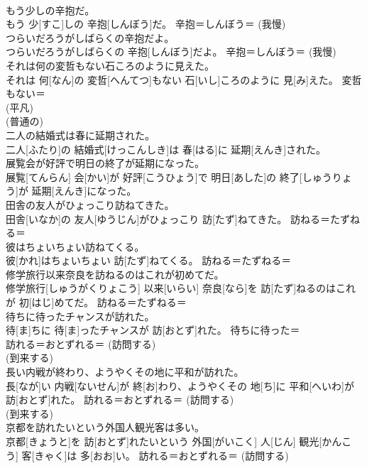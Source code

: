 \documentclass[8pt]{extreport}
\begin{document}
\begin{CJK}{UTF8}{min}
{\\	もう少しの辛抱だ。	
\\	もう 少[すこ]しの 辛抱[しんぼう]だ。	辛抱＝しんぼう＝ (我慢) 
\\	つらいだろうがしばらくの辛抱だよ。	
\\	つらいだろうがしばらくの 辛抱[しんぼう]だよ。	辛抱＝しんぼう＝ (我慢) 
\\	それは何の変哲もない石ころのように見えた。	
\\	それは 何[なん]の 変哲[へんてつ]もない 石[いし]ころのように 見[み]えた。	変哲もない＝ 
\\	(平凡) 
\\	(普通の) 
\\	二人の結婚式は春に延期された。	
\\	二人[ふたり]の 結婚式[けっこんしき]は 春[はる]に 延期[えんき]された。	
\\	展覧会が好評で明日の終了が延期になった。	
\\	展覧[てんらん] 会[かい]が 好評[こうひょう]で 明日[あした]の 終了[しゅうりょう]が 延期[えんき]になった。	
\\	田舎の友人がひょっこり訪ねてきた。	
\\	田舎[いなか]の 友人[ゆうじん]がひょっこり 訪[たず]ねてきた。	訪ねる＝たずねる＝ 
\\	彼はちょいちょい訪ねてくる。	
\\	彼[かれ]はちょいちょい 訪[たず]ねてくる。	訪ねる＝たずねる＝ 
\\	修学旅行以来奈良を訪ねるのはこれが初めてだ。	
\\	修学旅行[しゅうがくりょこう] 以来[いらい] 奈良[なら]を 訪[たず]ねるのはこれが 初[はじ]めてだ。	訪ねる＝たずねる＝ 
\\	待ちに待ったチャンスが訪れた。	
\\	待[ま]ちに 待[ま]ったチャンスが 訪[おとず]れた。	待ちに待った＝ 
\\	訪れる＝おとずれる＝ (訪問する) 
\\	(到来する) 
\\	長い内戦が終わり、ようやくその地に平和が訪れた。	
\\	長[なが]い 内戦[ないせん]が 終[お]わり、ようやくその 地[ち]に 平和[へいわ]が 訪[おとず]れた。	訪れる＝おとずれる＝ (訪問する) 
\\	(到来する) 
\\	京都を訪れたいという外国人観光客は多い。	
\\	京都[きょうと]を 訪[おとず]れたいという 外国[がいこく] 人[じん] 観光[かんこう] 客[きゃく]は 多[おお]い。	訪れる＝おとずれる＝ (訪問する) 
}
\end{CJK}
\end{document}
